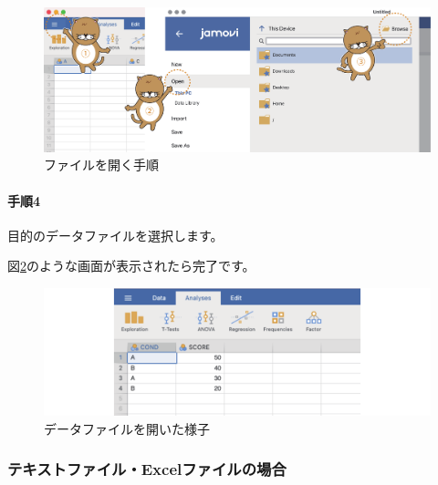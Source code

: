 \documentclass[
  12pt,
  a5jpaper,
  lualatex, ja=standard]{bxjsbook}
\begin{document}
\begin{figure}[!ht]

{\centering \includegraphics[width=1\linewidth]{images/intro/exercise} 

}

\caption{ファイルを開く手順}\label{fig:file-exercise}
\end{figure}

\hypertarget{yon}{%
\paragraph*{手順4}\label{yon}}

目的のデータファイルを選択します。

図\ref{fig:file-exercise-done}のような画面が表示されたら完了です。

\begin{figure}[!ht]

{\centering \includegraphics[width=1\linewidth]{images/intro/exercise-done} 

}

\caption{データファイルを開いた様子}\label{fig:file-exercise-done}
\end{figure}

\hypertarget{exceldatafilenobaai}{%
\subsubsection*{テキストファイル・Excelファイルの場合}\label{exceldatafilenobaai}}
\end{document}
